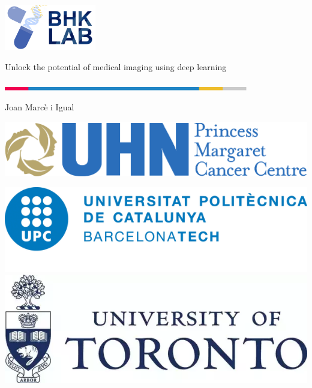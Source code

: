 \documentclass[xcolor={x11names, table, dvipsnames}, compress]{beamer}
\begin{document}
{
    \begin{frame}
        \begin{flushright}
            \hfill\includegraphics[width=0.3\textwidth]{images_presentation/logo}
        \end{flushright}
        \begin{flushleft}
            \begin{flushleft}
                \huge \color{BHKpresentationDark} 
                Unlock the potential of medical imaging using deep learning 
            \end{flushleft}

            \hspace{-1cm}\includegraphics[width=0.8\textwidth]{images_presentation/title_line}\hfill
            
            \date{$~~$}
            {\begin{flushleft} Joan Marcè i Igual\end{flushleft}}
            \titlepage
        \end{flushleft}
        
        \begin{flushright}
            \vspace{-3cm}
            \includegraphics[width=.35\textwidth]{images_presentation/pmcp-logo} 

            \vspace{0.5cm}
            \includegraphics[width=.35\textwidth]{images_presentation/upc-logo} \hspace{1cm}
            \includegraphics[width=.35\textwidth]{images_presentation/uoft-logo}
        \end{flushright}
    \end{frame}
}
\end{document}
